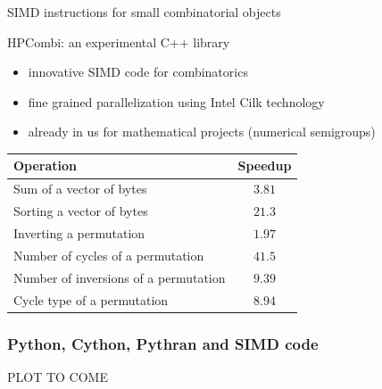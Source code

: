 \documentclass{beamer}
\begin{document}
\begin{frame}{SIMD instructions for small combinatorial objects}

  \begin{block}{HPCombi: an experimental C++ library}
  \begin{itemize}
  \item innovative SIMD code for combinatorics
  \item fine grained parallelization using Intel Cilk technology
  \item already in us for mathematical projects (numerical semigroups)
  \end{itemize}
  \end{block}

  \begin{center}\begin{tabular}{l|c}
  Operation & Speedup \\\hline
  Sum of a vector of bytes & $3.81$\\
  Sorting a vector of bytes& $21.3$\\
  Inverting a permutation& $1.97$\\
  Number of cycles of a permutation& $41.5$\\
  Number of inversions of a permutation& $9.39$\\
  Cycle type of a permutation& $8.94$\\
  \end{tabular}\end{center}

\end{frame}

\begin{frame}
  \frametitle{Python, Cython, Pythran and SIMD code}

\begin{center}
PLOT TO COME
\end{center}

\end{frame}
\end{document}
